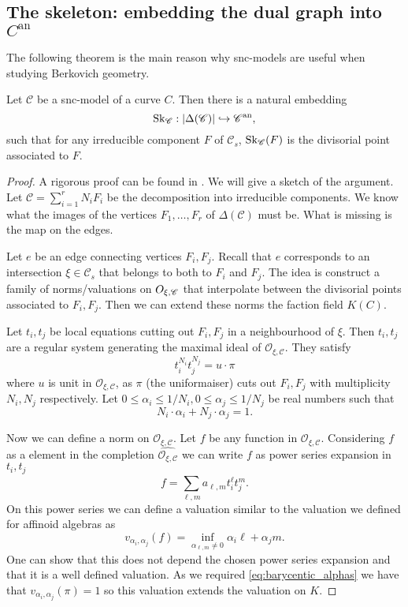 \subsection{The skeleton: embedding the dual graph into $C^{\mathrm{an}}$}\label{sec:skeleton}
The following theorem is the main reason why snc-models are useful when studying Berkovich geometry. 
\begin{theorem}
	Let $\mathscr C$ be a snc-model of a curve $C$. 
	Then there is a natural embedding \[
		\operatorname{Sk}_{\mathscr C}:|\Delta(\mathscr C)| \hookrightarrow \mathscr C{}^{\text{an}}
	,\]
	such that for any irreducible component $F$ of $\mathscr C_s$,  $\operatorname{Sk}_{\mathscr C}(F)$ is the divisorial point associated to $F$. 
\end{theorem}
\begin{proof}
	A rigorous proof can be found in \cite[3.1.4]{mustataWeightFunctionsNonArchimedean2015}.
	We will give a sketch of the argument. 
	Let $\mathscr C = \sum_{i= 1}^{r} N_i F_i$ be the decomposition into irreducible components. 
	We know what the images of the vertices $F_1, \ldots, F_r$ of $\Delta(\mathscr C)$ must be.
	What is missing is the map on the edges. 

	Let $e$ be an edge connecting vertices $F_i, F_j$. 
	Recall that $e$ corresponds to an intersection $\xi \in \mathscr C_s$ that belongs to both to $F_i$ and $F_j$. 
	The idea is construct a family of norms/valuations on $\mathscr \mathcal{O}_{\xi, \mathscr C}$ that interpolate between the divisorial points associated to $F_i, F_j$. Then we can extend these norms the faction field $K(C)$. 

	Let $t_i, t_j$ be local equations cutting out $F_i, F_j$ in a neighbourhood of  $\xi$. 
	Then $t_i, t_j$ are a regular system generating the maximal ideal of $\mathcal{O}_{\xi, \mathscr C}. $ 
	They satisfy \[
		t_i ^{N_i} t _j^{N_j} = u\cdot \pi
	\] 
	where $u$ is unit in $\mathcal{O}_{\xi, \mathscr C}$, as $\pi$ (the uniformaiser) cuts out $F_i, F_j$ with multiplicity $N_i, N_j$ respectively.  
	Let $0 \le \alpha_i \le 1 / N_i,   0 \le \alpha_j \le 1 / N_j$ be real numbers such that \begin{equation}\label{eq:barycentic_alphas}
		N_i\cdot \alpha_i + N_j \cdot \alpha_j = 1
	.\end{equation}
	
	Now we can define a norm on $\mathcal{O}_{\xi, \mathscr C}$. 
	Let  $f$ be any function in $\mathcal{O}_{\xi, \mathscr C}$. 
	Considering $f$ as a element in the completion $\hat{\mathcal{O}_{\xi, \mathscr C}}$ we can write $f$ as power series expansion in $t_i, t_j$  \[
		f = \sum_{\ell, m}^{} a_{\ell, m} t_i ^{\ell} t_j^{m}
	.\] 
	On this power series we can define a valuation similar to the valuation we defined  for affinoid algebras as \[
		v_{\alpha_i, \alpha_j}(f) = \inf_{\alpha_{\ell, m} \ne 0}{\alpha_i \ell + \alpha_j m}
	.\] 
	One can show that this does not depend the chosen power series expansion and that it is a well defined valuation. 
	As we required \eqref{eq:barycentic_alphas} we have that  $v_{\alpha_i, \alpha_j}(\pi) = 1$ so this valuation extends the valuation on $K$. 
\end{proof}
